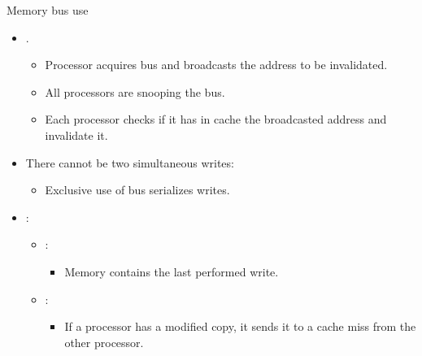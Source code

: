 \begin{frame}[t]{Memory bus use}
\begin{itemize}
  \item {}.
    \begin{itemize}
      \item Processor acquires bus and broadcasts the address to be invalidated.
      \item All processors are snooping the bus.
      \item Each processor checks if it has in cache the broadcasted address and invalidate it.
    \end{itemize}

  \item There cannot be two simultaneous writes:
    \begin{itemize}
      \item Exclusive use of bus serializes writes.
    \end{itemize}

  \item {}:
    \begin{itemize}
      \item {}:
        \begin{itemize}
          \item Memory contains the last performed write.
        \end{itemize}
      \item {}:
        \begin{itemize}
          \item If a processor has a modified copy,
                it sends it to a cache miss from the other processor.
        \end{itemize}
    \end{itemize}
\end{itemize}
\end{frame}


